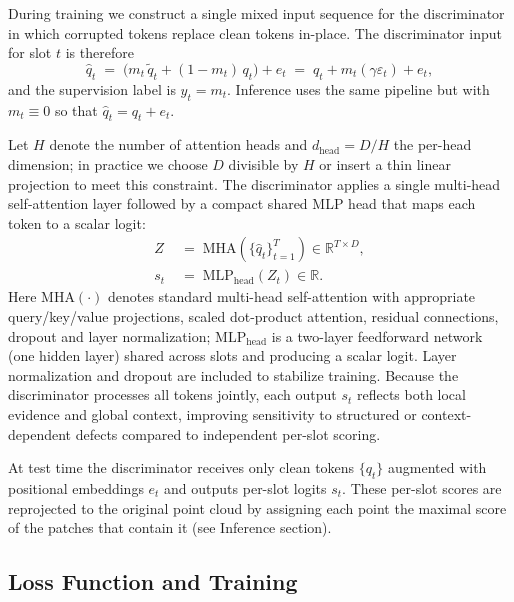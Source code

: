 During training we construct a single mixed input sequence for the discriminator in which corrupted tokens replace clean tokens in-place. The discriminator input for slot \(t\) is therefore
\begin{equation}
\hat{q}_t \;=\; \big(m_t\,\tilde{q}_t + (1-m_t)\,q_t\big) + e_t \;=\; q_t + m_t(\gamma\varepsilon_t) + e_t,
\end{equation}
and the supervision label is \(y_t=m_t\). Inference uses the same pipeline but with \(m_t\equiv 0\) so that \(\hat{q}_t=q_t+e_t\).

Let \(H\) denote the number of attention heads and \(d_{\mathrm{head}}=D/H\) the per-head dimension; in practice we choose \(D\) divisible by \(H\) or insert a thin linear projection to meet this constraint. The discriminator applies a single multi-head self-attention layer followed by a compact shared MLP head that maps each token to a scalar logit:
\begin{align}
Z \; &=\; \mathrm{MHA}(\{\hat{q}_t\}_{t=1}^T)\in\mathbb{R}^{T\times D},\\
s_t \; &=\; \mathrm{MLP}_{\mathrm{head}}(Z_t)\in\mathbb{R}.
\end{align}
Here \(\mathrm{MHA}(\cdot)\) denotes standard multi-head self-attention with appropriate query/key/value projections, scaled dot-product attention, residual connections, dropout and layer normalization; \(\mathrm{MLP}_{\mathrm{head}}\) is a two-layer feedforward network (one hidden layer) shared across slots and producing a scalar logit. Layer normalization and dropout are included to stabilize training. Because the discriminator processes all tokens jointly, each output \(s_t\) reflects both local evidence and global context, improving sensitivity to structured or context-dependent defects compared to independent per-slot scoring.

At test time the discriminator receives only clean tokens \(\{q_t\}\) augmented with positional embeddings \(e_t\) and outputs per-slot logits \(s_t\). These per-slot scores are reprojected to the original point cloud by assigning each point the maximal score of the patches that contain it (see Inference section).

\subsection{Loss Function and Training}
\label{sec:loss}

